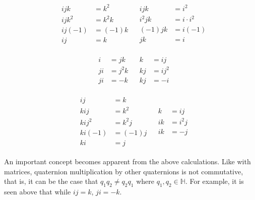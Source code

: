 \documentclass[12pt, a4paper]{article}
\begin{document}
\begin{align*}
     &
    \begin{aligned}
        ijk    & = k^2   \\
        ijk^2  & = k^2k  \\
        ij(-1) & = (-1)k \\
        ij     & = k
    \end{aligned}
     &
    \begin{aligned}
        ijk    & = i^2         \\
        i^2 jk & = i \cdot i^2 \\
        (-1)jk & = i(-1)       \\
        jk     & = i
    \end{aligned}
\end{align*}

\begin{align*}
     &
    \begin{aligned}
        i  & = jk   \\
        ji & = j^2k \\
        ji & = -k
    \end{aligned}
     &
    \begin{aligned}
        k  & = ij   \\
        kj & = ij^2 \\
        kj & = -i
    \end{aligned}
\end{align*}

\begin{align*}
     &
    \begin{aligned}
        ij     & = k     \\
        kij    & = k^2   \\
        kij^2  & = k^2j  \\
        ki(-1) & = (-1)j \\
        ki     & = j
    \end{aligned}
     &
    \begin{aligned}
        k  & = ij   \\
        ik & = i^2j \\
        ik & = -j
    \end{aligned}
\end{align*}

An important concept becomes apparent from the above calculations. Like with
matrices, quaternion multiplication by other quaternions is not commutative,
that is, it can be the case that $q_1q_2 \neq q_2q_1$ where $ q_1,q_2 \in
\mathbb{H}$. For example, it is seen above that while $ij = k$, $ji = -k$. \\
\end{document}
